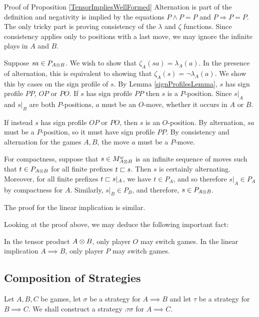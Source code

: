 \documentclass{entcs} \usepackage{prentcsmacro}
\newcommand{\0}{{\mathtt{0}}}
\begin{document}
\begin{proof*}{Proof of Proposition \ref{TensorImpliesWellFormed}}
  Alternation is part of the definition and negativity is implied by the equations $P\wedge P = P$ and $P\Rightarrow P = P$.  The only tricky part is proving consistency of the $\lambda$ and $\zeta$ functions.  Since consistency applies only to positions with a last move, we may ignore the infinite plays in $A$ and $B$.  

  Suppose $sa\in P_{A\otimes B}$.  We wish to show that $\zeta_{A}(sa)=\lambda_A(a)$.  In the presence of alternation, this is equivalent to showing that $\zeta_A(s) = \neg \lambda_A(a)$.  We show this by cases on the sign profile of $s$.  By Lemma \ref{signProfilesLemma}, $s$ has sign profile $PP$, $OP$ or $PO$.  If $s$ has sign profile $PP$ then $s$ is a $P$-position.  Since $s\vert_A$ and $s\vert_B$ are both $P$-positions, $a$ must be an $O$-move, whether it occurs in $A$ or $B$.  

  If instead $s$ has sign profile $OP$ or $PO$, then $s$ is an $O$-position.  By alternation, $sa$ must be a $P$-position, so it must have sign profile $PP$.  By consistency and alternation for the games $A,B$, the move $a$ must be a $P$-move.  

  For compactness, suppose that $s\in M_{A\otimes B}^\omega$ is an infinite sequence of moves such that $t\in P_{A\otimes B}$ for all finite prefixes $t\sqsubset s$.  Then $s$ is certainly alternating.  Moreover, for all finite prefixes $t\sqsubset s\vert_A$, we have $t\in P_A$, and so therefore $s\vert_A\in P_A$ by compactness for $A$.  Similarly, $s\vert_B\in P_B$, and therefore, $s\in P_{A\otimes B}$.

  The proof for the linear implication is similar.
\end{proof*}

Looking at the proof above, we may deduce the following important fact:

\begin{proposition}
  In the tensor product $A\otimes B$, only player $O$ may switch games.  In the linear implication $A\implies B$, only player $P$ may switch games.
\end{proposition}

\subsection{Composition of Strategies}

Let $A,B,C$ be games, let $\sigma$ be a strategy for $A\implies B$ and let $\tau$ be a strategy for $B\implies C$.  We shall construct a strategy $\comp\tau\sigma$ for $A\implies C$.  
\end{document}
